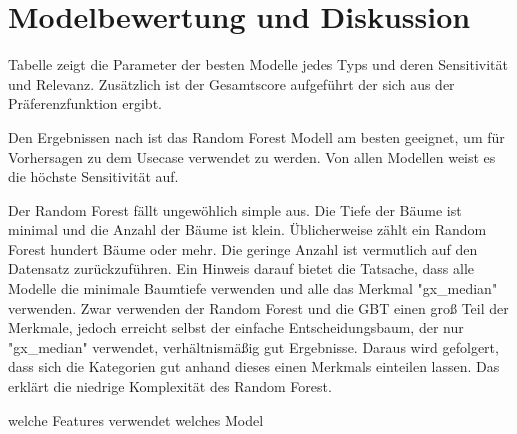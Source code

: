 \chapter{Modelbewertung und Diskussion}
\label{ch:modelbewertung}
Tabelle  zeigt die Parameter der besten Modelle jedes Typs und deren Sensitivität und Relevanz. Zusätzlich ist der Gesamtscore aufgeführt der sich aus der Präferenzfunktion ergibt.



Den Ergebnissen nach ist das Random Forest Modell am besten geeignet, um für Vorhersagen zu dem Usecase verwendet zu werden. Von allen Modellen weist es die höchste Sensitivität auf. 

Der Random Forest fällt ungewöhlich simple aus. Die Tiefe der Bäume ist minimal und die Anzahl der Bäume ist klein. Üblicherweise zählt ein Random Forest hundert Bäume oder mehr. Die geringe Anzahl ist vermutlich auf den Datensatz zurückzuführen. Ein Hinweis darauf bietet die Tatsache, dass alle Modelle die minimale Baumtiefe verwenden und alle das Merkmal "gx\_median" verwenden. Zwar verwenden der Random Forest und die GBT einen groß Teil der Merkmale, jedoch erreicht selbst der einfache Entscheidungsbaum, der nur "gx\_median" verwendet, verhältnismäßig gut Ergebnisse. Daraus wird gefolgert, dass sich die Kategorien gut anhand dieses einen Merkmals einteilen lassen. Das erklärt die niedrige Komplexität des Random Forest.


welche Features verwendet welches Model